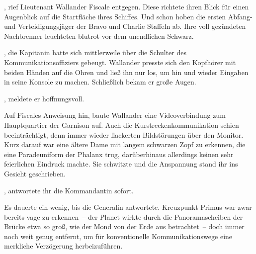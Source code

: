 \par

, rief Lieutenant Wallander Fiscale entgegen. Diese richtete ihren Blick für einen Augenblick auf die Startfläche ihres Schiffes. Und schon hoben die ersten Abfang- und Verteidigungsjäger der Bravo und Charlie Staffeln ab. Ihre voll gezündeten Nachbrenner leuchteten blutrot vor dem unendlichen Schwarz.

\par

, die Kapitänin hatte sich mittlerweile über die Schulter des Kommunikationsoffiziers gebeugt. Wallander presste sich den Kopfhörer mit beiden Händen auf die Ohren und ließ ihn nur los, um hin und wieder Eingaben in seine Konsole zu machen. Schließlich bekam er große Augen.

\par

, meldete er hoffnungsvoll. 

\par


\par

Auf Fiscales Anweisung hin, baute Wallander eine Videoverbindung zum Hauptquartier der Garnison auf. Auch die Kurstreckenkommunikation schien beeinträchtigt, denn immer wieder flackerten Bildstörungen über den Monitor. Kurz darauf war eine ältere Dame mit langem schwarzen Zopf zu erkennen, die eine Paradeuniform der Phalanx trug, darüberhinaus allerdings keinen sehr feierlichen Eindruck machte. Sie schwitzte und die Anspannung stand ihr ins Gesicht geschrieben.

\par


\par

, antwortete ihr die Kommandantin sofort. 

\par

Es dauerte ein wenig, bis die Generalin antwortete. Kreuzpunkt Primus war zwar bereits vage zu erkennen~-- der Planet wirkte durch die Panoramascheiben der Brücke etwa so groß, wie der Mond von der Erde aus betrachtet~-- doch immer noch weit genug entfernt, um für konventionelle Kommunikationswege eine merkliche Verzögerung herbeizuführen.

